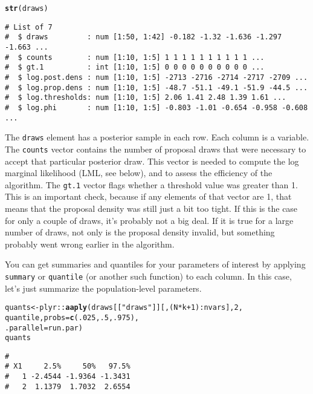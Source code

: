 \documentclass[10pt]{article}\usepackage[]{graphicx}\usepackage[]{color}
\makeatletter
\newcommand{\hlnum}[1]{\textcolor[rgb]{0.686,0.059,0.569}{#1}}%
\newcommand{\hlstr}[1]{\textcolor[rgb]{0.192,0.494,0.8}{#1}}%
\newcommand{\hlopt}[1]{\textcolor[rgb]{0,0,0}{#1}}%
\newcommand{\hlstd}[1]{\textcolor[rgb]{0.345,0.345,0.345}{#1}}%
\newcommand{\hlkwb}[1]{\textcolor[rgb]{0.69,0.353,0.396}{#1}}%
\newcommand{\hlkwc}[1]{\textcolor[rgb]{0.333,0.667,0.333}{#1}}%
\newcommand{\hlkwd}[1]{\textcolor[rgb]{0.737,0.353,0.396}{\textbf{#1}}}%
\newenvironment{kframe}{%
 \def\at@end@of@kframe{}%
 \ifinner\ifhmode%
  \def\at@end@of@kframe{\end{minipage}}%
  \begin{minipage}{\columnwidth}%
 \fi\fi%
 \def\FrameCommand##1{\hskip\@totalleftmargin \hskip-\fboxsep
 \colorbox{shadecolor}{##1}\hskip-\fboxsep
     \hskip-\linewidth \hskip-\@totalleftmargin \hskip\columnwidth}%
 \MakeFramed {\advance\hsize-\width
   \@totalleftmargin\z@ \linewidth\hsize
   \@setminipage}}%
 {\par\unskip\endMakeFramed%
 \at@end@of@kframe}
\newenvironment{knitrout}{}{} %
\renewenvironment{knitrout}{\begin{singlespace}}{\end{singlespace}}
\newcommand{\func}[1]{\texttt{#1}}
\newcommand{\funcarg}[1]{\texttt{#1}}
\makeatother
\begin{document}
\begin{knitrout}
\color{fgcolor}\begin{kframe}
\begin{alltt}
\hlkwd{str}\hlstd{(draws)}
\end{alltt}
\begin{verbatim}
# List of 7
#  $ draws         : num [1:50, 1:42] -0.182 -1.32 -1.636 -1.297 -1.663 ...
#  $ counts        : num [1:10, 1:5] 1 1 1 1 1 1 1 1 1 1 ...
#  $ gt.1          : int [1:10, 1:5] 0 0 0 0 0 0 0 0 0 0 ...
#  $ log.post.dens : num [1:10, 1:5] -2713 -2716 -2714 -2717 -2709 ...
#  $ log.prop.dens : num [1:10, 1:5] -48.7 -51.1 -49.1 -51.9 -44.5 ...
#  $ log.thresholds: num [1:10, 1:5] 2.06 1.41 2.48 1.39 1.61 ...
#  $ log.phi       : num [1:10, 1:5] -0.803 -1.01 -0.654 -0.958 -0.608 ...
\end{verbatim}
\end{kframe}
\end{knitrout}

The \funcarg{draws} element has a posterior sample in each row.  Each
column is a variable.  The \funcarg{counts}
vector contains the number of proposal draws that were necessary to
accept that particular posterior draw.  This vector is needed to
compute the log marginal likelihood (LML, see below), and to assess
the efficiency of the algorithm.  The \funcarg{gt.1} vector flags whether a
threshold value was greater than 1.  This is an important check,
because if any elements of that vector are 1, that means that the
proposal density was still just a bit too tight.  If this is the case
for only a couple of draws, it's probably not a big deal.  If it is
true for a large number of draws, not only is the proposal density
invalid, but something probably went wrong earlier in the algorithm.

You can get summaries and quantiles for your parameters of interest by
applying \func{summary} or \func{quantile} (or another such function)
to each column.  In this case, let's just summarize the
population-level parameters.

\begin{knitrout}
\color{fgcolor}\begin{kframe}
\begin{alltt}
\hlstd{quants} \hlkwb{<-}  \hlstd{plyr::}\hlkwd{aaply}\hlstd{(draws[[}\hlstr{"draws"}\hlstd{]][,(N}\hlopt{*}\hlstd{k}\hlopt{+}\hlnum{1}\hlstd{)}\hlopt{:}\hlstd{nvars],} \hlnum{2}\hlstd{,}
                       \hlstd{quantile,} \hlkwc{probs}\hlstd{=}\hlkwd{c}\hlstd{(}\hlnum{.025}\hlstd{,} \hlnum{.5}\hlstd{,} \hlnum{.975}\hlstd{),}
                       \hlkwc{.parallel} \hlstd{= run.par)}
\hlstd{quants}
\end{alltt}
\begin{verbatim}
#    
# X1     2.5%     50%   97.5%
#   1 -2.4544 -1.9364 -1.3431
#   2  1.1379  1.7032  2.6554
\end{verbatim}
\end{kframe}
\end{knitrout}
\end{document}
